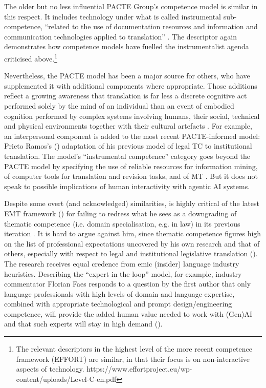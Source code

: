 \documentclass[output=paper]{langscibook}
\begin{document}
The older but no less influential PACTE Group’s competence model \citep[35--41]{hurtado_albir_researching_2017} is similar in this respect. It includes technology under what is called instrumental sub-competence, “related to the use of documentation resources and information and communication technologies applied to translation” \citep[40]{hurtado_albir_researching_2017}. The descriptor again demonstrates how competence models have fuelled the instrumentalist agenda criticised above.\footnote{The relevant descriptors  in the highest level of the more recent competence framework (EFFORT) are similar, in that their focus is on non-interactive aspects of technology. https://www.effortproject.eu/wp-content/uploads/Level-C-en.pdf}

Nevertheless, the PACTE model has been a major source for others, who have supplemented it with additional components where appropriate. Those additions reflect a growing awareness that translation is far less a discrete cognitive act performed solely by the mind of an individual than an event of embodied cognition performed by complex systems involving humans, their social, technical and physical environments together with their cultural artefacts \citep[103]{risku_cognitive_2010}. For example, an interpersonal component is added to the most recent PACTE-informed model: Prieto Ramos's (\citeyear{PrietoRamos2024_revisiting}) adaptation of his previous model of legal TC \citep{prieto_ramos_developing_2011} to institutional translation. The model’s “instrumental competence” category goes beyond the PACTE model by specifying the use of reliable resources for information mining, of computer tools for translation and revision tasks, and of MT \citep[155]{PrietoRamos2024_revisiting}. But it does not speak to possible implications of human interactivity with agentic AI systems. 

Despite some overt (and acknowledged) similarities, \citet[153]{PrietoRamos2024_revisiting} is highly critical of the latest EMT framework (\citeyear{emt_european_2022}) for failing to redress what he sees as a downgrading of thematic competence (i.e. domain specialisation, e.g. in law) in its previous iteration \citep{emt_european_2017}. It is hard to argue against him, since thematic competence figures high on the list of professional expectations uncovered by his own research and that of others, especially with respect to legal and institutional legislative translation (\citealt{esfandiari_evaluation_2019, lafeber_skills_2023, prieto_ramos_institutional_2023}). The research receives equal credence from emic (insider) language industry heuristics. Describing the \citet{slator_slator_2022} “expert in the loop” model, for example, industry commentator Florian Faes responds to a question by the first author that only language professionals with high levels of domain and language expertise, combined with appropriate technological and prompt design/engineering competence, will provide the added human value needed to work with (Gen)AI and that such experts will stay in high demand (\citealt[27--29]{faesmassey_2024}). 
\end{document}
